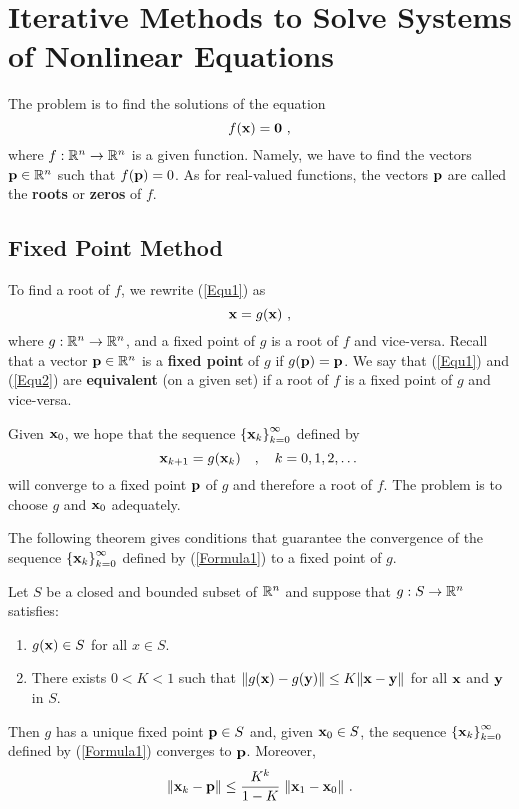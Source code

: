 \chapter{Iterative Methods to Solve Systems of Nonlinear Equations}
\label{chaptSeqD}

The problem is to find the solutions of the equation
\begin{equation} \label{Equ1}
f(\mathbf{x})  = \mathbf{0} \ ,
\end{equation}
where $f:\mathbb{R}^n \rightarrow \mathbb{R}^n$ is a given function.  Namely, we
have to find the vectors $\mathbf{p} \in \mathbb{R}^n$ such that $f(\mathbf{p}) = 0$.
As for real-valued functions, the vectors $\mathbf{p}$ are called the
{\bfseries roots} or
{\bfseries zeros} of $f$.

\section{Fixed Point Method}

To find a root of $f$, we rewrite (\ref{Equ1}) as
\begin{equation} \label{Equ2}
\mathbf{x}  =  g(\mathbf{x}) \ ,
\end{equation}
where $g:\mathbb{R}^n \rightarrow \mathbb{R}^n$, and a fixed point of $g$ is a root
of $f$ and vice-versa.  Recall that a vector $\mathbf{p} \in \mathbb{R}^n$ is a
{\bfseries fixed point} of $g$ if
$g(\mathbf{p}) = \mathbf{p}$.  We say that
(\ref{Equ1}) and (\ref{Equ2}) are
{\bfseries equivalent} (on a given
set) if a root of $f$ is a fixed point of $g$ and vice-versa.

Given $\mathbf{x}_0$, we hope that the sequence
$\left\{\mathbf{x}_k\right\}_{k=0}^\infty$ defined by
\begin{equation} \label{Formula1}
\mathbf{x}_{k+1} = g(\mathbf{x}_k)\quad ,\quad  k=0,1,2,\dots
\end{equation}
will converge to a fixed point $\mathbf{p}$ of $g$ and therefore a root
of $f$.  The problem is to choose $g$ and $\mathbf{x}_0$ adequately.

The following theorem gives conditions that guarantee the convergence
of the sequence
$\displaystyle \left\{\mathbf{x}_k\right\}_{k=0}^\infty$ defined by
(\ref{Formula1}) to a fixed point of $g$.

\begin{theorem}
Let $S$ be a closed and bounded subset of $\mathbb{R}^n$ and suppose that
$g:S \rightarrow \mathbb{R}^n$ satisfies:
\begin{enumerate}
\item $g(\mathbf{x})\in S$ for all $x\in S$.
\item There exists $0<K<1$ such that
$\| g(\mathbf{x}) - g(\mathbf{y}) \| \leq K \| \mathbf{x} - \mathbf{y} \|$ for all
$\mathbf{x}$ and $\mathbf{y}$ in $S$.
\end{enumerate}
Then $g$ has a unique fixed point $\mathbf{p} \in S$ and, given
$\mathbf{x}_0 \in S $, the sequence
$\left\{\mathbf{x}_k\right\}_{k=0}^\infty$
defined by (\ref{Formula1}) converges to $\mathbf{p}$.  Moreover,
\[
\| \mathbf{x}_k - \mathbf{p} \| \leq \frac{K^k}{1-K}\;
\| \mathbf{x}_1 - \mathbf{x}_0 \| \ .
\]
\label{FixedPTinRN}
\end{theorem}

